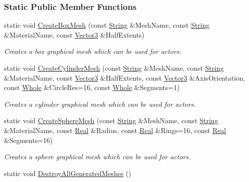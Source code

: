 \subsubsection*{Static Public Member Functions}
\begin{DoxyCompactItemize}
\item 
static void \hyperlink{classphys_1_1MeshGenerator_a1710315174186367ce566125feb3df6d}{CreateBoxMesh} (const \hyperlink{namespacephys_aa03900411993de7fbfec4789bc1d392e}{String} \&MeshName, const \hyperlink{namespacephys_aa03900411993de7fbfec4789bc1d392e}{String} \&MaterialName, const \hyperlink{classphys_1_1Vector3}{Vector3} \&HalfExtents)
\begin{DoxyCompactList}\small\item\em Creates a box graphical mesh which can be used for actors. \item\end{DoxyCompactList}\item 
static void \hyperlink{classphys_1_1MeshGenerator_a7d7372e91e3d039c656f78be3cb5b951}{CreateCylinderMesh} (const \hyperlink{namespacephys_aa03900411993de7fbfec4789bc1d392e}{String} \&MeshName, const \hyperlink{namespacephys_aa03900411993de7fbfec4789bc1d392e}{String} \&MaterialName, const \hyperlink{classphys_1_1Vector3}{Vector3} \&HalfExtents, const \hyperlink{classphys_1_1Vector3}{Vector3} \&AxisOrientation, const \hyperlink{namespacephys_a460f6bc24c8dd347b05e0366ae34f34a}{Whole} \&CircleRes=16, const \hyperlink{namespacephys_a460f6bc24c8dd347b05e0366ae34f34a}{Whole} \&Segments=1)
\begin{DoxyCompactList}\small\item\em Creates a cylinder graphical mesh which can be used for actors. \item\end{DoxyCompactList}\item 
static void \hyperlink{classphys_1_1MeshGenerator_a2d1dfdfe8fae04773de67118a4513f5d}{CreateSphereMesh} (const \hyperlink{namespacephys_aa03900411993de7fbfec4789bc1d392e}{String} \&MeshName, const \hyperlink{namespacephys_aa03900411993de7fbfec4789bc1d392e}{String} \&MaterialName, const \hyperlink{namespacephys_af7eb897198d265b8e868f45240230d5f}{Real} \&Radius, const \hyperlink{namespacephys_af7eb897198d265b8e868f45240230d5f}{Real} \&Rings=16, const \hyperlink{namespacephys_af7eb897198d265b8e868f45240230d5f}{Real} \&Segments=16)
\begin{DoxyCompactList}\small\item\em Creates a sphere graphical mesh which can be used for actors. \item\end{DoxyCompactList}\item 
\hypertarget{classphys_1_1MeshGenerator_a7bc0a9b527251b8273b9da6772cc83c3}{
static void \hyperlink{classphys_1_1MeshGenerator_a7bc0a9b527251b8273b9da6772cc83c3}{DestroyAllGeneratedMeshes} ()}
\label{classphys_1_1MeshGenerator_a7bc0a9b527251b8273b9da6772cc83c3}


\end{DoxyCompactItemize}
